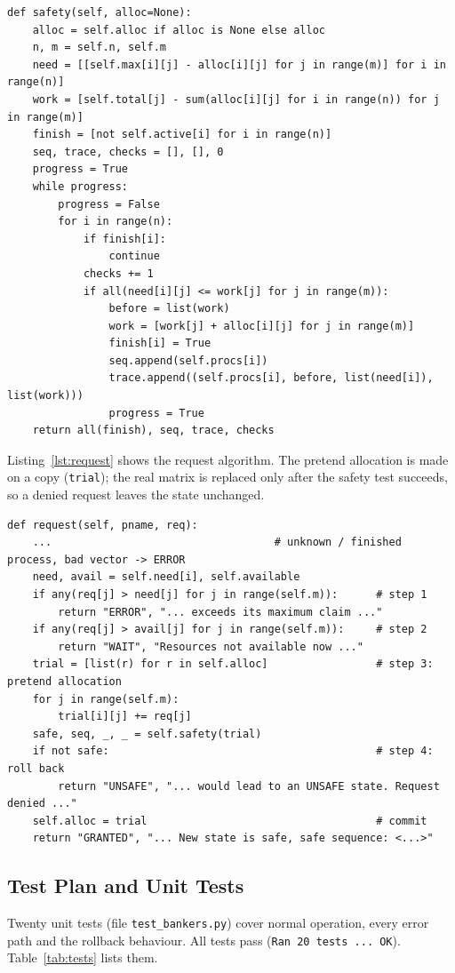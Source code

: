 \documentclass[11pt,a4paper]{report}
\begin{document}
\begin{lstlisting}[style=py,caption={Safety algorithm (method \texttt{Banker.safety}).},label={lst:safety}]
def safety(self, alloc=None):
    alloc = self.alloc if alloc is None else alloc
    n, m = self.n, self.m
    need = [[self.max[i][j] - alloc[i][j] for j in range(m)] for i in range(n)]
    work = [self.total[j] - sum(alloc[i][j] for i in range(n)) for j in range(m)]
    finish = [not self.active[i] for i in range(n)]
    seq, trace, checks = [], [], 0
    progress = True
    while progress:
        progress = False
        for i in range(n):
            if finish[i]:
                continue
            checks += 1
            if all(need[i][j] <= work[j] for j in range(m)):
                before = list(work)
                work = [work[j] + alloc[i][j] for j in range(m)]
                finish[i] = True
                seq.append(self.procs[i])
                trace.append((self.procs[i], before, list(need[i]), list(work)))
                progress = True
    return all(finish), seq, trace, checks
\end{lstlisting}

Listing~\ref{lst:request} shows the request algorithm. The pretend allocation is made on a copy (\texttt{trial}); the real matrix is replaced only after the safety test succeeds, so a denied request leaves the state unchanged.

\begin{lstlisting}[style=py,caption={Resource-request algorithm (method \texttt{Banker.request}).},label={lst:request}]
def request(self, pname, req):
    ...                                   # unknown / finished process, bad vector -> ERROR
    need, avail = self.need[i], self.available
    if any(req[j] > need[j] for j in range(self.m)):      # step 1
        return "ERROR", "... exceeds its maximum claim ..."
    if any(req[j] > avail[j] for j in range(self.m)):     # step 2
        return "WAIT", "Resources not available now ..."
    trial = [list(r) for r in self.alloc]                 # step 3: pretend allocation
    for j in range(self.m):
        trial[i][j] += req[j]
    safe, seq, _, _ = self.safety(trial)
    if not safe:                                          # step 4: roll back
        return "UNSAFE", "... would lead to an UNSAFE state. Request denied ..."
    self.alloc = trial                                    # commit
    return "GRANTED", "... New state is safe, safe sequence: <...>"
\end{lstlisting}

\subsection{Test Plan and Unit Tests}
Twenty unit tests (file \texttt{test\_bankers.py}) cover normal operation, every error path and the rollback behaviour. All tests pass (\texttt{Ran 20 tests ... OK}). Table~\ref{tab:tests} lists them.
\end{document}
